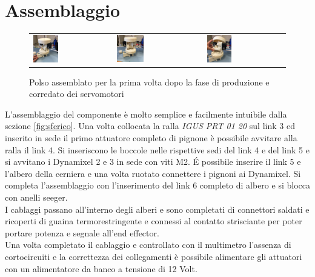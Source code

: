 \documentclass[%
corpo=11pt,
twoside,
 stile=classica,
oldstyle,
greek,%
]{toptesi}
\begin{document}
	\section{Assemblaggio}
	\begin{figure}
		\centering
		\begin{tabular}{lll}
			\includegraphics[width=0.33\textwidth]{image/w1.jpg}
			&
			\includegraphics[width=0.33\textwidth]{image/w2.jpg}
			&
			\includegraphics[width=0.33\textwidth]{image/w3.jpg}
		\end{tabular}
		\caption{Polso assemblato per la prima volta dopo la fase di produzione e corredato dei servomotori}
		\label{fig:wristassembled}
	\end{figure}
	L'assemblaggio del componente è molto semplice e facilmente intuibile dalla sezione \ref{fig:sferico}. Una volta collocata la ralla \textit{IGUS PRT 01 20} sul link 3 ed inserito in sede il primo attuatore completo di pignone è possibile avvitare alla ralla il link 4. Si inseriscono le boccole nelle rispettive sedi del link 4 e del link 5 e si avvitano i Dynamixel 2 e 3 in sede con viti M2. \'E possibile inserire il link 5 e l'albero della cerniera e una volta ruotato connettere i pignoni ai Dynamixel. Si completa l'assemblaggio con l'inserimento del link 6 completo di albero e si blocca con anelli seeger.\\
	I cablaggi passano all'interno degli alberi e sono completati di connettori saldati e ricoperti di guaina termorestringente e connessi al contatto strisciante per poter portare potenza e segnale all'end effector. \\
	Una volta completato il cablaggio e controllato con il multimetro l'assenza di cortocircuiti e la correttezza dei collegamenti è possibile alimentare gli attuatori con un alimentatore da banco a tensione di 12 Volt. \\
	
\end{document}
